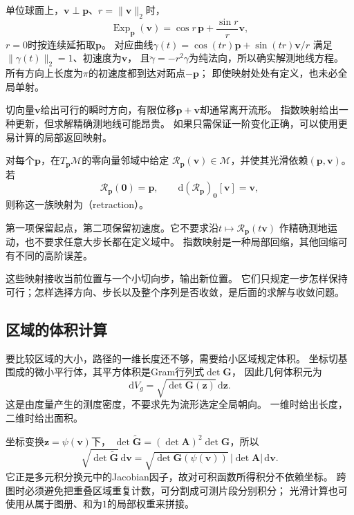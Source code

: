 单位球面上，$\bm v\perp\bm p$、$r=\lVert\bm v\rVert_2$时，
\begin{equation}
 \operatorname{Exp}_{\bm p}(\bm v)
 =\cos r\,\bm p+\frac{\sin r}{r}\bm v,
 \label{eq:geometry-sphere-exponential}
\end{equation}
$r=0$时按连续延拓取$\bm p$。
对应曲线$\gamma(t)=\cos(tr)\bm p+\sin(tr)\bm v/r$
满足$\lVert\gamma(t)\rVert_2=1$、初速度为$\bm v$，
且$\ddot\gamma=-r^2\gamma$为纯法向，所以确实解测地线方程。
所有方向上长度为$\pi$的初速度都到达对跖点$-\bm p$；
即使映射处处有定义，也未必全局单射。


切向量$\bm v$给出可行的瞬时方向，有限位移$\bm p+\bm v$却通常离开流形。
指数映射给出一种更新，但求解精确测地线可能昂贵。
如果只需保证一阶变化正确，可以使用更易计算的局部返回映射。

\begin{definition}[回缩]
\label{def:geometry-retraction}
对每个$\bm p$，在$T_{\bm p}\mathcal M$的零向量邻域中给定
$\mathcal R_{\bm p}(\bm v)\in\mathcal M$，并使其光滑依赖$(\bm p,\bm v)$。
若
\[
 \mathcal R_{\bm p}(\bm0)=\bm p,\qquad
 \mathrm d(\mathcal R_{\bm p})_{\bm0}[\bm v]=\bm v,
\]
则称这一族映射为（retraction）。
\end{definition}
第一项保留起点，第二项保留初速度。它不要求沿$t\mapsto\mathcal R_{\bm p}(t\bm v)$
作精确测地运动，也不要求任意大步长都在定义域中。
指数映射是一种局部回缩，其他回缩可有不同的高阶误差。


这些映射接收当前位置与一个小切向步，输出新位置。
它们只规定一步怎样保持可行；怎样选择方向、步长以及整个序列是否收敛，是后面的求解与收敛问题。

\subsection{区域的体积计算}
\label{sec:geometry-riemannian-volume}

要比较区域的大小，路径的一维长度还不够，需要给小区域规定体积。
坐标切基围成的微小平行体，其平方体积是Gram行列式$\det\bm G$，
因此几何体积元为
\begin{equation}
 \mathrm dV_g=\sqrt{\det\bm G(\bm z)}\,\mathrm d\bm z.
 \label{eq:geometry-riemannian-volume}
\end{equation}
这是由度量产生的测度密度，不要求先为流形选定全局朝向。
一维时给出长度，二维时给出面积。

坐标变换$\bm z=\psi(\bm v)$下，
$\det\widetilde{\bm G}=(\det\bm A)^2\det\bm G$，所以
\[
 \sqrt{\det\widetilde{\bm G}}\,\mathrm d\bm v
 =\sqrt{\det\bm G(\psi(\bm v))}\,|\det\bm A|\,\mathrm d\bm v.
\]
它正是多元积分换元中的Jacobian因子，故对可积函数所得积分不依赖坐标。
跨图时必须避免把重叠区域重复计数，可分割成可测片段分别积分；
光滑计算也可使用从属于图册、和为$1$的局部权重来拼接。

